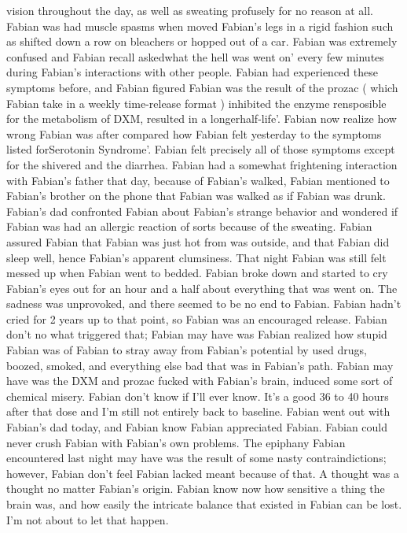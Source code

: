 \documentclass[12pt]{book}
\begin{document}
vision throughout the day, as well as sweating profusely for no reason at all. Fabian was had muscle spasms when moved Fabian's legs in a rigid fashion such as shifted down a row on bleachers or hopped out of a car. Fabian was extremely confused and Fabian recall askedwhat the hell was went on' every few minutes during Fabian's interactions with other people. Fabian had experienced these symptoms before, and Fabian figured Fabian was the result of the prozac ( which Fabian take in a weekly time-release format ) inhibited the enzyme rensposible for the metabolism of DXM, resulted in a longerhalf-life'. Fabian now realize how wrong Fabian was after compared how Fabian felt yesterday to the symptoms listed forSerotonin Syndrome'. Fabian felt precisely all of those symptoms except for the shivered and the diarrhea. Fabian had a somewhat frightening interaction with Fabian's father that day, because of Fabian's walked, Fabian mentioned to Fabian's brother on the phone that Fabian was walked as if Fabian was drunk. Fabian's dad confronted Fabian about Fabian's strange behavior and wondered if Fabian was had an allergic reaction of sorts because of the sweating. Fabian assured Fabian that Fabian was just hot from was outside, and that Fabian did sleep well, hence Fabian's apparent clumsiness. That night Fabian was still felt messed up when Fabian went to bedded. Fabian broke down and started to cry Fabian's eyes out for an hour and a half about everything that was went on. The sadness was unprovoked, and there seemed to be no end to Fabian. Fabian hadn't cried for 2 years up to that point, so Fabian was an encouraged release. Fabian don't no what triggered that; Fabian may have was Fabian realized how stupid Fabian was of Fabian to stray away from Fabian's potential by used drugs, boozed, smoked, and everything else bad that was in Fabian's path. Fabian may have was the DXM and prozac fucked with Fabian's brain, induced some sort of chemical misery. Fabian don't know if I'll ever know. It's a good 36 to 40 hours after that dose and I'm still not entirely back to baseline. Fabian went out with Fabian's dad today, and Fabian know Fabian appreciated Fabian. Fabian could never crush Fabian with Fabian's own problems. The epiphany Fabian encountered last night may have was the result of some nasty contraindictions; however, Fabian don't feel Fabian lacked meant because of that. A thought was a thought no matter Fabian's origin. Fabian know now how sensitive a thing the brain was, and how easily the intricate balance that existed in Fabian can be lost. I'm not about to let that happen.
\end{document}
